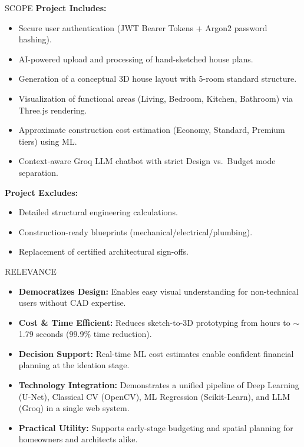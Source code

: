 \documentclass[aspectratio=169]{beamer}
\begin{document}
\begin{frame}{SCOPE}
\textbf{Project Includes:}
\begin{itemize}
  \item Secure user authentication (JWT Bearer Tokens + Argon2 password hashing).
  \item AI-powered upload and processing of hand-sketched house plans.
  \item Generation of a conceptual 3D house layout with 5-room standard structure.
  \item Visualization of functional areas (Living, Bedroom, Kitchen, Bathroom) via Three.js rendering.
  \item Approximate construction cost estimation (Economy, Standard, Premium tiers) using ML.
  \item Context-aware Groq LLM chatbot with strict Design vs.\ Budget mode separation.
\end{itemize}
\vspace{0.3cm}
\textbf{Project Excludes:}
\begin{itemize}
  \item Detailed structural engineering calculations.
  \item Construction-ready blueprints (mechanical/electrical/plumbing).
  \item Replacement of certified architectural sign-offs.
\end{itemize}
\end{frame}

\begin{frame}{RELEVANCE}
\begin{itemize}
  \item \textbf{Democratizes Design:} Enables easy visual understanding for non-technical users without CAD expertise.
  \item \textbf{Cost \& Time Efficient:} Reduces sketch-to-3D prototyping from hours to $\sim$1.79 seconds (99.9\% time reduction).
  \item \textbf{Decision Support:} Real-time ML cost estimates enable confident financial planning at the ideation stage.
  \item \textbf{Technology Integration:} Demonstrates a unified pipeline of Deep Learning (U-Net), Classical CV (OpenCV), ML Regression (Scikit-Learn), and LLM (Groq) in a single web system.
  \item \textbf{Practical Utility:} Supports early-stage budgeting and spatial planning for homeowners and architects alike.
\end{itemize}
\end{frame}
\end{document}
